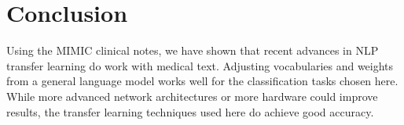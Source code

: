 \documentclass{amia}
\begin{document}
\section*{Conclusion}

Using the MIMIC clinical notes, we have shown that recent advances in NLP transfer learning do work with medical text. Adjusting vocabularies and weights from a general language model works well for the classification tasks chosen here. While more advanced network architectures or more hardware could improve results, the transfer learning techniques used here do achieve good accuracy.



\end{document}
